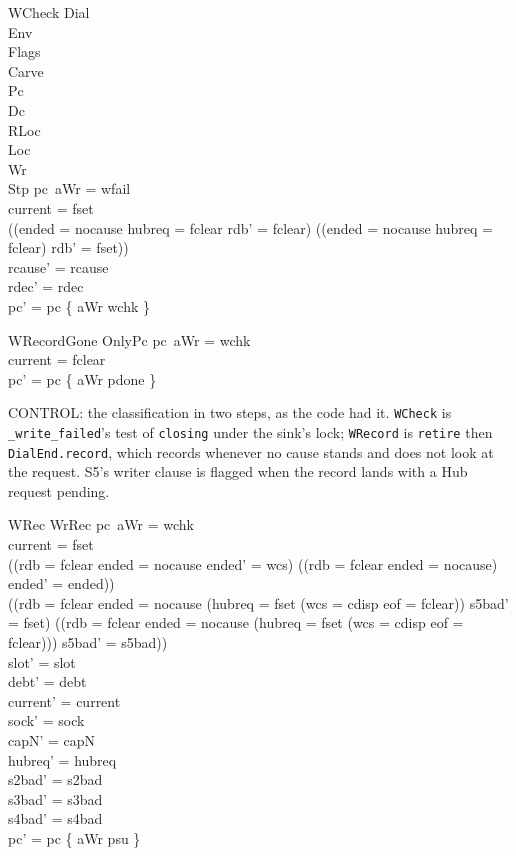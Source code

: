 \documentclass[a4paper,10pt,fleqn]{article}
\begin{document}
\begin{schema}{WCheck}
  \Xi Dial \\ \Xi Env \\ \Xi Flags \\ \Xi Carve \\ \Delta Pc \\ \Xi Dc \\
  \Delta RLoc \\ \Xi Loc \\ \Xi Wr \\ \Xi Stp
\where
  pc~aWr = wfail \\
  current = fset \\
  ((ended = nocause \land hubreq = fclear \land rdb' = fclear) \lor
    (\lnot (ended = nocause \land hubreq = fclear) \land rdb' = fset)) \\
  rcause' = rcause \\
  rdec' = rdec \\
  pc' = pc \oplus \{ aWr \mapsto wchk \}
\end{schema}

\begin{schema}{WRecordGone}
  OnlyPc
\where
  pc~aWr = wchk \\
  current = fclear \\
  pc' = pc \oplus \{ aWr \mapsto pdone \}
\end{schema}

CONTROL: the classification in two steps, as the code had it.  \texttt{WCheck} is
\texttt{\_write\_failed}'s test of \texttt{closing} under the sink's lock;
\texttt{WRecord} is \texttt{retire} then \texttt{DialEnd.record}, which records
whenever no cause stands and does not look at the request.  S5's writer clause is
flagged when the record lands with a Hub request pending.

\begin{schema}{WRec}
  WrRec
\where
  pc~aWr = wchk \\
  current = fset \\
  ((rdb = fclear \land ended = nocause \land ended' = wcs) \lor
    (\lnot (rdb = fclear \land ended = nocause) \land ended' = ended)) \\
  ((rdb = fclear \land ended = nocause \land
      (hubreq = fset \lor (wcs = cdisp \land eof = fclear)) \land s5bad' = fset) \lor
    (\lnot (rdb = fclear \land ended = nocause \land
      (hubreq = fset \lor (wcs = cdisp \land eof = fclear))) \land s5bad' = s5bad)) \\
  slot' = slot \\
  debt' = debt \\
  current' = current \\
  sock' = sock \\
  capN' = capN \\
  hubreq' = hubreq \\
  s2bad' = s2bad \\
  s3bad' = s3bad \\
  s4bad' = s4bad \\
  pc' = pc \oplus \{ aWr \mapsto psu \}
\end{schema}
\end{document}

